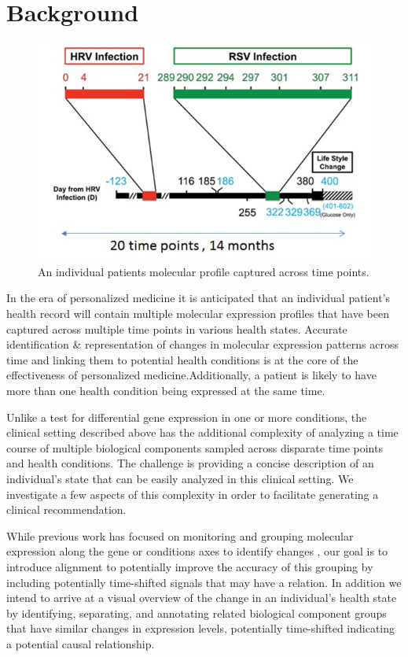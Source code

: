 \documentclass[aps,prd,final,onecolumn,a4paper,10pt]{revtex4}
\begin{document}
\section{Background}
	\begin{figure}[H]
\centering
\includegraphics[scale=0.65]{Introduction.png}
\caption{An individual patients molecular profile captured across time points.}
\label{fig:PatientTimeCourses}
\end{figure}

	In the era of personalized medicine it is anticipated that an individual patient's health record will contain multiple molecular expression profiles that have been captured across multiple time points in various health states. Accurate identification \& representation of changes in molecular expression patterns across time and linking them to potential health conditions is at the core of the effectiveness of personalized medicine.Additionally, a patient is likely to have more than one health condition being expressed at the same time.

  Unlike a test for differential gene expression in one or more conditions, the clinical setting described above has the additional complexity of analyzing a time course of multiple biological components sampled across disparate time points and health conditions. The challenge is providing a concise description of an individual’s state that can be easily analyzed in this clinical setting. We investigate a few aspects of this complexity in order to facilitate generating a clinical recommendation.

  While previous work has focused on monitoring and grouping molecular expression along the gene or conditions axes to identify changes , our goal is to introduce alignment to potentially improve the accuracy of this grouping by including potentially time-shifted signals that may have a relation. 
  In addition we intend to arrive at a visual overview of the change in an individual’s health state by identifying, separating, and annotating related biological component groups that have similar changes in expression levels, potentially time-shifted indicating a potential causal relationship.
  
\end{document}
